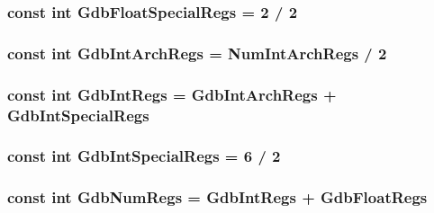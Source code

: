 \label{namespaceMipsISA_a2cc3ae8e0cc393b8de3b4c2f3677bdd0}
\hypertarget{namespaceMipsISA_af8dc5d46886267ca2c0eda8d7ef3acdc}{
\subsubsection[{GdbFloatSpecialRegs}]{\setlength{\rightskip}{0pt plus 5cm}const int {\bf GdbFloatSpecialRegs} = 2 / 2}}
\label{namespaceMipsISA_af8dc5d46886267ca2c0eda8d7ef3acdc}
\hypertarget{namespaceMipsISA_a4619f25a19f75050cec7dc07621b0599}{
\subsubsection[{GdbIntArchRegs}]{\setlength{\rightskip}{0pt plus 5cm}const int {\bf GdbIntArchRegs} = {\bf NumIntArchRegs} / 2}}
\label{namespaceMipsISA_a4619f25a19f75050cec7dc07621b0599}
\hypertarget{namespaceMipsISA_a10a302d033444fc245bb517d13588869}{
\subsubsection[{GdbIntRegs}]{\setlength{\rightskip}{0pt plus 5cm}const int {\bf GdbIntRegs} = {\bf GdbIntArchRegs} + {\bf GdbIntSpecialRegs}}}
\label{namespaceMipsISA_a10a302d033444fc245bb517d13588869}
\hypertarget{namespaceMipsISA_a3fdba04e31a7d07d44575f023cd6c344}{
\subsubsection[{GdbIntSpecialRegs}]{\setlength{\rightskip}{0pt plus 5cm}const int {\bf GdbIntSpecialRegs} = 6 / 2}}
\label{namespaceMipsISA_a3fdba04e31a7d07d44575f023cd6c344}
\hypertarget{namespaceMipsISA_a23ee23761a1a5c7317b01891fd58e85a}{
\subsubsection[{GdbNumRegs}]{\setlength{\rightskip}{0pt plus 5cm}const int {\bf GdbNumRegs} = {\bf GdbIntRegs} + {\bf GdbFloatRegs}}}
